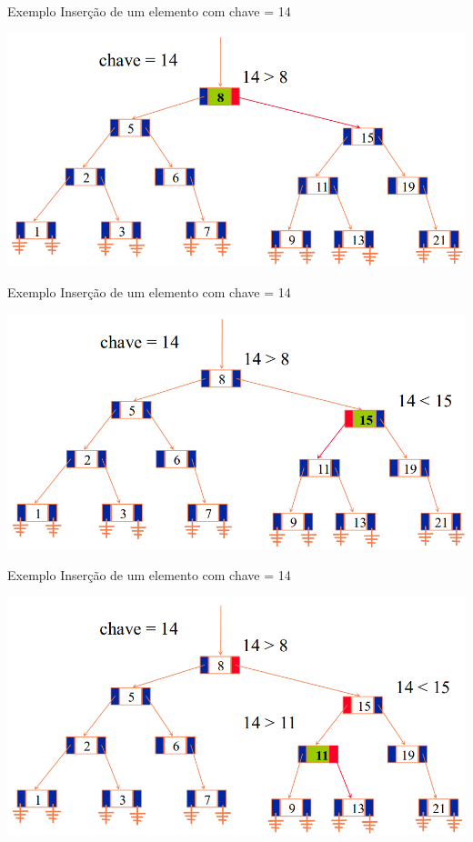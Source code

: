 \documentclass[12pt,table,xcolor={dvipsnames}]{beamer}
\begin{document}
\begin{frame}[fragile]{Exemplo}
Inserção de um elemento com chave = 14
\begin{center}
\includegraphics[scale=.3]{arv2.png} 
\end{center}
\end{frame}

\begin{frame}[fragile]{Exemplo}
Inserção de um elemento com chave = 14
\begin{center}
\includegraphics[scale=.3]{arv3.png} 
\end{center}
\end{frame}

\begin{frame}[fragile]{Exemplo}
Inserção de um elemento com chave = 14
\begin{center}
\includegraphics[scale=.3]{arv4.png} 
\end{center}
\end{frame}
\end{document}
